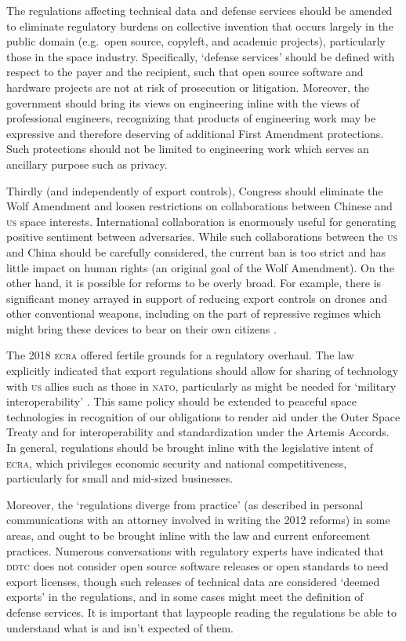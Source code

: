 \documentclass[preprint,twocolumn,5p]{elsarticle}
\begin{document}
The regulations affecting technical data and defense services should be amended to eliminate regulatory burdens on collective invention that occurs largely in the public domain (e.g.\ open source, copyleft, and academic projects), particularly those in the space industry. Specifically, `defense services' should be defined with respect to the payer and the recipient, such that open source software and hardware projects are not at risk of prosecution or litigation. Moreover, the government should bring its views on engineering inline with the views of professional engineers, recognizing that products of engineering work may be expressive and therefore deserving of additional First Amendment protections. Such protections should not be limited to engineering work which serves an ancillary purpose such as privacy.

Thirdly (and independently of export controls), Congress should eliminate the Wolf Amendment and loosen restrictions on collaborations between Chinese and \textsc{us} space interests. International collaboration is enormously useful for generating positive sentiment between adversaries. While such collaborations between the \textsc{us} and China should be carefully considered, the current ban is too strict and has little impact on human rights (an original goal of the Wolf Amendment). On the other hand, it is possible for reforms to be overly broad. For example, there is significant money arrayed in support of reducing export controls on drones and other conventional weapons, including on the part of repressive regimes which might bring these devices to bear on their own citizens \citep{Summers2020}.

The 2018 \textsc{ecra} offered fertile grounds for a regulatory overhaul. The law explicitly indicated that export regulations should allow for sharing of technology with \textsc{us} allies such as those in \textsc{nato}, particularly as might be needed for `military interoperability' \citep{ECRA2018}. This same policy should be extended to peaceful space technologies in recognition of our obligations to render aid under the Outer Space Treaty and for interoperability and standardization under the Artemis Accords. In general, regulations should be brought inline with the legislative intent of \textsc{ecra}, which privileges economic security and national competitiveness, particularly for small and mid-sized businesses.

Moreover, the `regulations diverge from practice' (as described in personal communications with an attorney involved in writing the 2012 reforms) in some areas, and ought to be brought inline with the law and current enforcement practices. Numerous conversations with regulatory experts have indicated that \textsc{ddtc} does not consider open source software releases or open standards to need export licenses, though such releases of technical data are considered `deemed exports' in the regulations, and in some cases might meet the definition of defense services. It is important that laypeople reading the regulations be able to understand what is and isn't expected of them.
\end{document}
